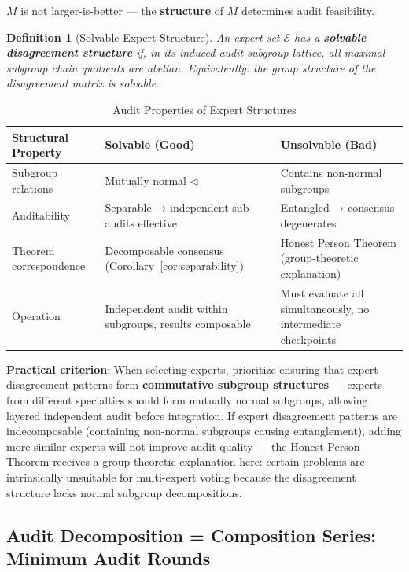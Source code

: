 \documentclass[10pt,a4paper]{article}
\newtheorem{definition}[theorem]{Definition}
\theoremstyle{remark}
\begin{document}
$M$ is not larger-is-better — the \textbf{structure} of $M$ determines audit feasibility.

\begin{definition}[Solvable Expert Structure]
An expert set $\mathcal{E}$ has a \textbf{solvable disagreement structure} if, in its induced audit subgroup lattice, all maximal subgroup chain quotients are abelian. Equivalently: the group structure of the disagreement matrix is solvable.
\end{definition}

\begin{table}[h]
\centering
\caption{Audit Properties of Expert Structures}
\small
\begin{tabular}{@{}p{3.2cm} p{4.2cm} p{4.2cm}@{}}
\toprule
\textbf{Structural Property} & \textbf{Solvable (Good)} & \textbf{Unsolvable (Bad)} \\
\midrule
Subgroup relations & Mutually normal $\triangleleft$ & Contains non-normal subgroups \\
Auditability & Separable → independent sub-audits effective & Entangled → consensus degenerates \\
Theorem correspondence & Decomposable consensus (Corollary~\ref{cor:separability}) & Honest Person Theorem (group-theoretic explanation) \\
Operation & Independent audit within subgroups, results composable & Must evaluate all simultaneously, no intermediate checkpoints \\
\bottomrule
\end{tabular}
\end{table}

\textbf{Practical criterion}: When selecting experts, prioritize ensuring that expert disagreement patterns form \textbf{commutative subgroup structures} — experts from different specialties should form mutually normal subgroups, allowing layered independent audit before integration. If expert disagreement patterns are indecomposable (containing non-normal subgroups causing entanglement), adding more similar experts will not improve audit quality — the Honest Person Theorem receives a group-theoretic explanation here: certain problems are intrinsically unsuitable for multi-expert voting because the disagreement structure lacks normal subgroup decompositions.

\subsection{Audit Decomposition = Composition Series: Minimum Audit Rounds}
\end{document}
